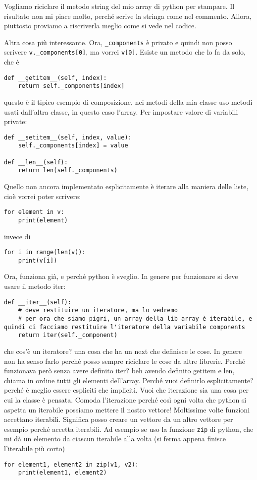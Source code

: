 \documentclass[10pt, a4paper, titlepage]{book}
\begin{document}
Vogliamo riciclare il metodo string del mio array di python per stampare. Il risultato non mi piace molto, perché scrive la stringa come nel commento. Allora, piuttosto proviamo a riscriverla meglio come si vede nel codice.

Altra cosa più interessante. Ora, \texttt{\_components} è privato e quindi non posso scrivere \texttt{v._components[0]}, ma vorrei \texttt{v[0]}. Esiste un metodo che lo fa da solo, che è 
\begin{verbatim}
def __getitem__(self, index):
	return self._components[index]
\end{verbatim}

questo è il tipico esempio di composizione, nei metodi della mia classe uso metodi usati dall'altra classe, in questo caso l'array.
Per impostare valore di variabili private:
\begin{verbatim}
def __setitem__(self, index, value):
	self._components[index] = value

def __len__(self):
	return len(self._components)	
\end{verbatim}

Quello non ancora implementato esplicitamente è iterare alla maniera delle liste, cioè vorrei poter scrivere:

\begin{verbatim}
for element in v: 
	print(element)
\end{verbatim}

invece di 

\begin{verbatim}
for i in range(len(v)):
	print(v[i])
\end{verbatim}

Ora, funziona già, e perché python è sveglio. In genere per funzionare si deve usare il metodo iter:

\begin{verbatim}
def __iter__(self):
	# deve restituire un iteratore, ma lo vedremo
	# per ora che siamo pigri, un array della lib array è iterabile, e quindi ci facciamo restituire l'iteratore della variabile components
	return iter(self._component)
\end{verbatim}

che cos'è un iteratore? una cosa che ha un next che definisce le cose. 
In genere non ha senso farlo perché posso sempre riciclare le cose da altre librerie.
Perché funzionava però senza avere definito iter? beh avendo definito getitem e len, chiama in ordine tutti gli elementi dell'array.
Perché vuoi definirlo esplicitamente? perché è meglio essere espliciti che impliciti. Vuoi che iterazione sia una cosa per cui la classe è pensata.
Comoda l'iterazione perché così ogni volta che python si aspetta un iterabile possiamo mettere il nostro vettore! Moltissime volte funzioni accettano iterabili. Significa posso creare un vettore da un altro vettore per esempio perché accetta iterabili.
Ad esempio se uso la funzione \texttt{zip} di python, che mi dà un elemento da ciascun iterabile alla volta (si ferma appena finisce l'iterabile più corto)
\begin{verbatim}
for element1, element2 in zip(v1, v2):
	print(element1, element2)	
\end{verbatim}
\end{document}
